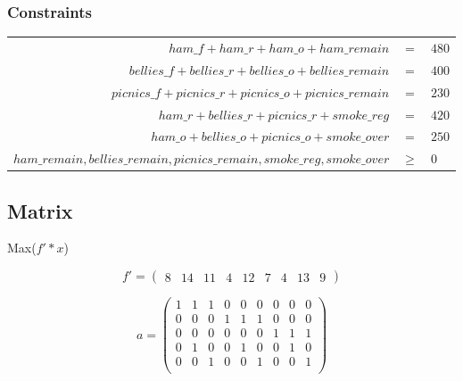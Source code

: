\documentclass[a4paper,10pt]{article}
\begin{document}
\subsubsection{Constraints} 

\begin{tabular}{rcl}
 $ham\_f + ham\_r + ham\_o + ham\_remain$& $=$ &$480$\\
$bellies\_f + bellies\_r + bellies\_o + bellies\_remain$ &$ =$ &$ 400$\\
$picnics\_f + picnics\_r + picnics\_o + picnics\_remain$ &$ =$ &$ 230$\\
$ham\_r + bellies\_r + picnics\_r + smoke\_reg $ &$= $ &$420$\\
$ham\_o + bellies\_o + picnics\_o + smoke\_over $ &$=$ &$ 250$\\
$ham\_remain, bellies\_remain, picnics\_remain, smoke\_reg, smoke\_over$ &$ \ge$ &$ 0$\\
\end{tabular}


	\subsection{Matrix}
	Max($f'*x$)
	
	\[ f' = \left( \begin{array}{ccccccccc}
	8 & 14 & 11 & 
	4 & 12 & 7 & 
	4 & 13 & 9  
	\end{array} \right)\]
	

	\[ a = \left( \begin{array}{ccccccccc}
	1 & 1 & 1 & 0 & 0 & 0 & 0 & 0 & 0 \\
	0 & 0 & 0 & 1 & 1 & 1 & 0 & 0 & 0 \\
	0 & 0 & 0 & 0 & 0 & 0 & 1 & 1 & 1 \\
	0 & 1 & 0 & 0 & 1 & 0 & 0 & 1 & 0 \\
	0 & 0 & 1 & 0 & 0 & 1 & 0 & 0 & 1 \\
	\end{array} \right)\]
	
\end{document}
